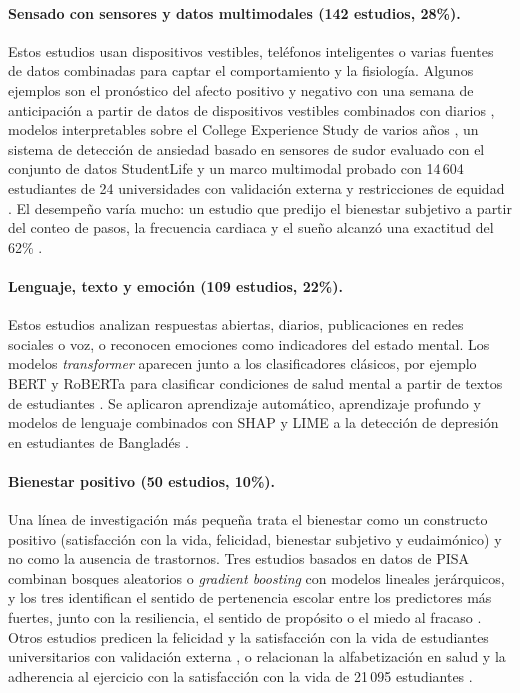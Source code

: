 \documentclass[11pt,a4paper]{article}
\begin{document}
\paragraph{Sensado con sensores y datos multimodales (142 estudios, 28\%).} Estos estudios usan dispositivos vestibles, teléfonos inteligentes o varias fuentes de datos combinadas para captar el comportamiento y la fisiología. Algunos ejemplos son el pronóstico del afecto positivo y negativo con una semana de anticipación a partir de datos de dispositivos vestibles combinados con diarios \cite{D061}, modelos interpretables sobre el College Experience Study de varios años \cite{I089,I100}, un sistema de detección de ansiedad basado en sensores de sudor evaluado con el conjunto de datos StudentLife \cite{D023} y un marco multimodal probado con 14\,604 estudiantes de 24 universidades con validación externa y restricciones de equidad \cite{S005}. El desempeño varía mucho: un estudio que predijo el bienestar subjetivo a partir del conteo de pasos, la frecuencia cardiaca y el sueño alcanzó una exactitud del 62\% \cite{D080}.

\paragraph{Lenguaje, texto y emoción (109 estudios, 22\%).} Estos estudios analizan respuestas abiertas, diarios, publicaciones en redes sociales o voz, o reconocen emociones como indicadores del estado mental. Los modelos \emph{transformer} aparecen junto a los clasificadores clásicos, por ejemplo BERT y RoBERTa para clasificar condiciones de salud mental a partir de textos de estudiantes \cite{I090,I254}. Se aplicaron aprendizaje automático, aprendizaje profundo y modelos de lenguaje combinados con SHAP y LIME a la detección de depresión en estudiantes de Bangladés \cite{D045}.

\paragraph{Bienestar positivo (50 estudios, 10\%).} Una línea de investigación más pequeña trata el bienestar como un constructo positivo (satisfacción con la vida, felicidad, bienestar subjetivo y eudaimónico) y no como la ausencia de trastornos. Tres estudios basados en datos de PISA combinan bosques aleatorios o \emph{gradient boosting} con modelos lineales jerárquicos, y los tres identifican el sentido de pertenencia escolar entre los predictores más fuertes, junto con la resiliencia, el sentido de propósito o el miedo al fracaso \cite{S040,S041,S048}. Otros estudios predicen la felicidad y la satisfacción con la vida de estudiantes universitarios con validación externa \cite{S021}, o relacionan la alfabetización en salud y la adherencia al ejercicio con la satisfacción con la vida de 21\,095 estudiantes \cite{D007}.
\end{document}

